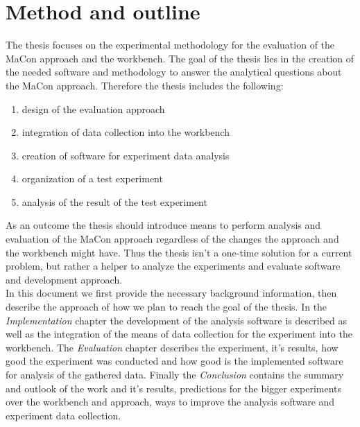  

\section{Method and outline}

The thesis focuses on the experimental methodology for the evaluation of the MaCon approach and the workbench. The goal of the thesis lies in the creation of the needed software and methodology to answer the analytical questions about the MaCon approach. Therefore the thesis includes the following:

\begin{enumerate} 
	\item design of the evaluation approach
	\item integration of data collection into the workbench 
	\item creation of software for experiment data analysis
	\item organization of a test experiment
	\item analysis of the result of the test experiment
\end{enumerate}

As an outcome the thesis should introduce means to perform analysis and evaluation of the MaCon approach regardless of the changes the approach and the workbench might have. Thus the thesis isn't a one-time solution for a current problem, but rather a helper to analyze the experiments and evaluate software and development approach.\\

In this document we first provide the necessary background information, then describe the approach of how we plan to reach the goal of the thesis. In the \textit{Implementation} chapter the development of the analysis software is described as well as the integration of the means of data collection for the experiment into the workbench. The \textit{Evaluation} chapter describes the experiment, it's results, how good the experiment was conducted and how good is the implemented software for analysis of the gathered data. Finally the \textit{Conclusion} contains  the summary and outlook of the work and it's results, predictions for the bigger experiments over the workbench and approach, ways to improve the analysis software and experiment data collection.